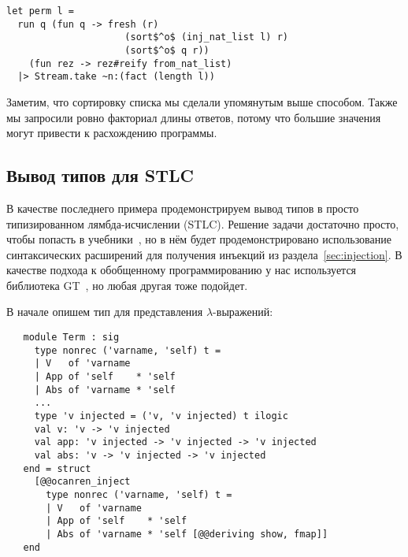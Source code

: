 \begin{lstlisting}
let perm l =
  run q (fun q -> fresh (r)
                     (sort$^o$ (inj_nat_list l) r)
                     (sort$^o$ q r))
    (fun rez -> rez#reify from_nat_list)
  |> Stream.take ~n:(fact (length l))
\end{lstlisting}

\noindent Заметим, что сортировку списка мы сделали упомянутым выше способом. Также мы запросили ровно факториал длины ответов, потому что большие значения могут привести к расхождению программы.


\subsection{Вывод типов для STLC}

В качестве последнего примера продемонстрируем вывод типов в просто типизированном лямбда-исчислении (STLC).
Решение задачи достаточно просто, чтобы попасть в учебники~\cite{TRS, WillThesis}, но в нём будет продемонстрировано использование синтаксических расширений для получения инъекций из раздела~\ref{sec:injection}.
В качестве подхода к обобщенному программированию у нас используется библиотека GT~\cite{GT2021}, но любая другая тоже подойдет.


В начале опишем тип для представления $\lambda$-выражений:

\begin{lstlisting}
   module Term : sig
     type nonrec ('varname, 'self) t =
     | V   of 'varname
     | App of 'self    * 'self
     | Abs of 'varname * 'self
     ...
     type 'v injected = ('v, 'v injected) t ilogic
     val v: 'v -> 'v injected
     val app: 'v injected -> 'v injected -> 'v injected
     val abs: 'v -> 'v injected -> 'v injected
   end = struct
     [@@ocanren_inject
       type nonrec ('varname, 'self) t =
       | V   of 'varname
       | App of 'self    * 'self
       | Abs of 'varname * 'self [@@deriving show, fmap]]
   end
\end{lstlisting}

